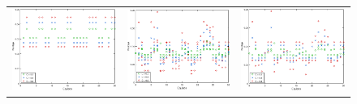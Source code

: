                 \begin{figure}
                    \begin{center}

                        \begin{tabular}{ccc}
                            \includegraphics{graficos/exp2-partidos-liga-afa1.pdf} & \includegraphics{graficos/exp2-partidos-liga-afa3.pdf} &
                            \includegraphics{graficos/exp2-partidos-liga-afa2.pdf}}

\end{tabular}
\end{center}
\end{figure}
